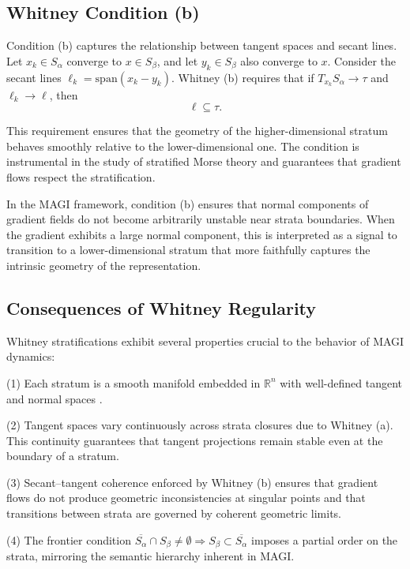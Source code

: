 \documentclass[12pt]{article}
\begin{document}
\subsection*{Whitney Condition (b)}

Condition (b) captures the relationship between tangent spaces and secant lines. Let $x_k \in S_\alpha$ converge to $x\in S_\beta$, and let $y_k \in S_\beta$ also converge to $x$. Consider the secant lines $\ell_k = \mathrm{span}(x_k - y_k)$. Whitney (b) requires that if $T_{x_k}S_\alpha \to \tau$ and $\ell_k \to \ell$, then
\[
\ell \subseteq \tau.
\]

This requirement ensures that the geometry of the higher-dimensional stratum behaves smoothly relative to the lower-dimensional one. The condition is instrumental in the study of stratified Morse theory \citep{GoreskyMacPherson1988} and guarantees that gradient flows respect the stratification.

In the MAGI framework, condition (b) ensures that normal components of gradient fields do not become arbitrarily unstable near strata boundaries. When the gradient exhibits a large normal component, this is interpreted as a signal to transition to a lower-dimensional stratum that more faithfully captures the intrinsic geometry of the representation.

\subsection*{Consequences of Whitney Regularity}

Whitney stratifications exhibit several properties crucial to the behavior of MAGI dynamics:

(1) Each stratum is a smooth manifold embedded in $\mathbb{R}^n$ with well-defined tangent and normal spaces \citep{GuilleminPollack1974}.

(2) Tangent spaces vary continuously across strata closures due to Whitney (a). This continuity guarantees that tangent projections remain stable even at the boundary of a stratum.

(3) Secant–tangent coherence enforced by Whitney (b) ensures that gradient flows do not produce geometric inconsistencies at singular points and that transitions between strata are governed by coherent geometric limits.

(4) The frontier condition $\overline{S_\alpha} \cap S_\beta \neq \emptyset \Rightarrow S_\beta \subset \overline{S_\alpha}$ imposes a partial order on the strata, mirroring the semantic hierarchy inherent in MAGI.
\end{document}
